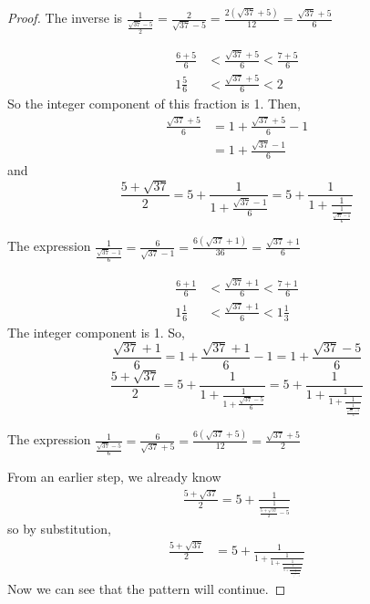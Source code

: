 \documentclass[11pt]{article}
\theoremstyle{definition}
\begin{document}
\begin{enumerate}
\begin{enumerate}
\begin{proof}
            The inverse is $\frac{1}{\frac{\sqrt{37} - 5}{2}} = \frac{2}{\sqrt{37} - 5} = \frac{2(\sqrt{37} + 5)}{12} = \frac{\sqrt{37} + 5}{6}$

            \begin{align*}
                \frac{6 + 5}{6} &< \frac{\sqrt{37} + 5}{6} < \frac{7 + 5}{6} \\
                1\frac{5}{6} &< \frac{\sqrt{37} + 5}{6} < 2
            \end{align*}
            So the integer component of this fraction is 1. Then, 
            \begin{align*}
                \frac{\sqrt{37} + 5}{6} &=  1 + \frac{\sqrt{37} + 5}{6} - 1 \\
                &= 1 + \frac{\sqrt{37}-1}{6}
            \end{align*}
            and 
            \[
                \frac{5+\sqrt{37}}{2} = 5 + \frac{1}{1 + \frac{\sqrt{37} - 1}{6}} = 5 + \frac{1}{1 + \frac{1}{\frac{1}{\frac{\sqrt{37} - 1}{6}}}}
            \]

            The expression $\frac{1}{\frac{\sqrt{37} - 1}{6}} = \frac{6}{\sqrt{37} - 1} = \frac{6(\sqrt{37} + 1)}{36} = \frac{\sqrt{37} + 1}{6}$

            \begin{align*}
                \frac{6 + 1}{6} &< \frac{\sqrt{37} + 1}{6} < \frac{7 + 1}{6} \\
                1\frac{1}{6} &< \frac{\sqrt{37} + 1}{6} < 1\frac{1}{3}
            \end{align*}
            The integer component is 1. So,
            \[
                \frac{\sqrt{37} + 1}{6} = 1 + \frac{\sqrt{37} + 1}{6} - 1 = 1 + \frac{\sqrt{37} - 5}{6}
            \]
            \[
                \frac{5+\sqrt{37}}{2} = 5 + \frac{1}{1 + \frac{1}{1 + \frac{\sqrt{37} - 5}{6}}} = 5 + \frac{1}{1 + \frac{1}{1 + \frac{1}{\frac{1}{\frac{\sqrt{37} - 5}{6}}}}}
            \]

            The expression $\frac{1}{\frac{\sqrt{37} - 5}{6}} = \frac{6}{\sqrt{37} + 5} = \frac{6(\sqrt{37} + 5)}{12} = \frac{\sqrt{37}+5}{2}$
            
            From an earlier step, we already know  
            \begin{align*}
                \frac{5+\sqrt{37}}{2} = 5 + \frac{1}{\frac{1}{\frac{5+\sqrt{37}}{2} - 5}}
            \end{align*}
            so by substitution, 
            \begin{align*}
                \frac{5+\sqrt{37}}{2} &= 5 + \frac{1}{1 + \frac{1}{1 + \frac{1}{\frac{1}{5 + \frac{1}{\frac{1}{\frac{5+\sqrt{37}}{2} - 5}}}}}}
            \end{align*}
            Now we can see that the pattern will continue. 


\end{proof}
\end{enumerate}
\end{enumerate}
\end{document}
